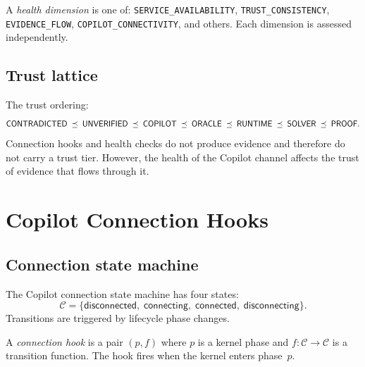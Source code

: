 \documentclass[11pt]{article}
\begin{document}
\begin{definition}\label{def:healthdim}
A \emph{health dimension} is one of:
\texttt{SERVICE\_AVAILABILITY},
\texttt{TRUST\_CONSISTENCY},
\texttt{EVIDENCE\_FLOW},
\texttt{COPILOT\_CONNECTIVITY},
and others.  Each dimension is assessed independently.
\end{definition}

\subsection{Trust lattice}

The trust ordering:
\[
  \mathsf{CONTRADICTED} \;\preceq\; \mathsf{UNVERIFIED} \;\preceq\; \mathsf{COPILOT}
  \;\preceq\; \mathsf{ORACLE} \;\preceq\; \mathsf{RUNTIME}
  \;\preceq\; \mathsf{SOLVER} \;\preceq\; \mathsf{PROOF}.
\]
Connection hooks and health checks do not produce evidence
and therefore do not carry a trust tier.  However, the
health of the Copilot channel affects the trust of
evidence that flows through it.

\section{Copilot Connection Hooks}\label{sec:connection}

\subsection{Connection state machine}

\begin{definition}\label{def:connstate}
The Copilot connection state machine has four states:
\[
  \mathcal{C} = \{\mathsf{disconnected},\; \mathsf{connecting},\;
                   \mathsf{connected},\; \mathsf{disconnecting}\}.
\]
Transitions are triggered by lifecycle phase changes.
\end{definition}

\begin{definition}\label{def:connhook}
A \emph{connection hook} is a pair $(p, f)$ where $p$ is
a kernel phase and $f \colon \mathcal{C} \to \mathcal{C}$
is a transition function.  The hook fires when the kernel
enters phase~$p$.
\end{definition}
\end{document}
